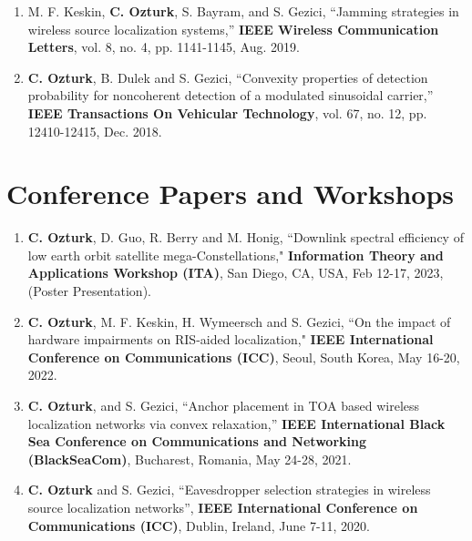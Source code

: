 \begin{enumerate}
	\item M. F. Keskin, {\bf C. Ozturk},  S. Bayram, and S. Gezici, ``{Jamming strategies in wireless source localization systems},'' {\bf IEEE Wireless Communication Letters}, vol. 8, no. 4, pp. 1141-1145, Aug. 2019.
	
	
	\item {\bf C. Ozturk}, B. Dulek and S. Gezici, ``{Convexity properties of detection probability for noncoherent detection of a modulated sinusoidal carrier},'' { \bf IEEE Transactions On Vehicular Technology}, vol. 67, no. 12, pp. 12410-12415, Dec. 2018. 

	

	
\end{enumerate}

\section{Conference Papers and Workshops}
\begin{enumerate}
	\item{{\bf C. Ozturk}, D. Guo, R. Berry and M. Honig, ``{Downlink spectral efficiency of low earth orbit satellite mega-Constellations}," {\bf Information Theory and Applications Workshop (ITA)}, San Diego, CA, USA, Feb 12-17, 2023, (Poster Presentation).	}
\item {\bf C. Ozturk}, M. F. Keskin, H. Wymeersch and S. Gezici, ``{On the impact of hardware impairments on RIS-aided localization}," {\bf IEEE International Conference on Communications (ICC)}, Seoul, South Korea, May 16-20, 2022.	

\item  {\bf C. Ozturk},  and S. Gezici, ``{Anchor placement in TOA based wireless localization networks via convex relaxation},'' {\bf  IEEE International Black Sea Conference on Communications and Networking} {\bf(BlackSeaCom)},  Bucharest, Romania, May 24-28, 2021. 	
	
\item  {\bf C. Ozturk} and S. Gezici, ``{Eavesdropper selection strategies in wireless source localization networks}'', {\bf IEEE International Conference on Communications (ICC)}, Dublin, Ireland, June 7-11, 2020.

\end{enumerate}


